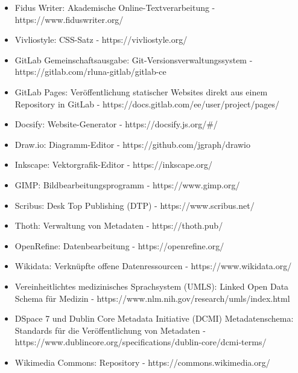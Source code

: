 \documentclass{article}
\begin{document}
\begin{itemize}
\item Fidus Writer: Akademische Online-Textverarbeitung - https://www.fiduswriter.org/


\item Vivliostyle: CSS-Satz - https://vivliostyle.org/


\item GitLab Gemeinschaftsausgabe: Git-Versionsverwaltungssystem - https://gitlab.com/rluna-gitlab/gitlab-ce


\item GitLab Pages: Veröffentlichung statischer Websites direkt aus einem Repository in GitLab - https://docs.gitlab.com/ee/user/project/pages/


\item Docsify: Website-Generator - https://docsify.js.org/\#/


\item Draw.io: Diagramm-Editor - https://github.com/jgraph/drawio


\item Inkscape: Vektorgrafik-Editor - https://inkscape.org/


\item GIMP: Bildbearbeitungsprogramm - https://www.gimp.org/


\item Scribus: Desk Top Publishing (DTP) - https://www.scribus.net/


\item Thoth: Verwaltung von Metadaten - https://thoth.pub/


\item OpenRefine: Datenbearbeitung - https://openrefine.org/


\item Wikidata: Verknüpfte offene Datenressourcen - https://www.wikidata.org/


\item Vereinheitlichtes medizinisches Sprachsystem (UMLS): Linked Open Data Schema für Medizin - https://www.nlm.nih.gov/research/umls/index.html


\item DSpace 7 und Dublin Core Metadata Initiative (DCMI) Metadatenschema: Standards für die Veröffentlichung von Metadaten - https://www.dublincore.org/specifications/dublin-core/dcmi-terms/


\item Wikimedia Commons: Repository - https://commons.wikimedia.org/



\end{itemize}
\end{document}
